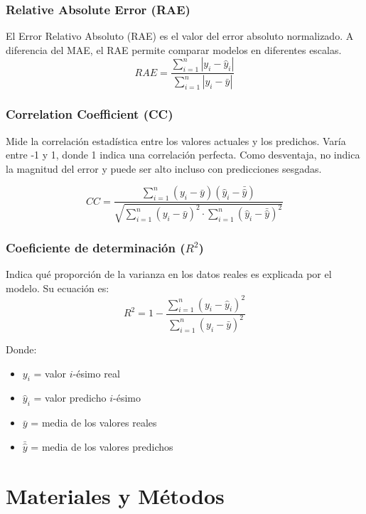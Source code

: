 \documentclass[12pt]{article}
\begin{document}
\subsubsection{Relative Absolute Error (RAE)}
El Error Relativo Absoluto (RAE) es el valor del error absoluto normalizado. A diferencia del MAE, el RAE permite comparar modelos en diferentes escalas.
\begin{equation}
    RAE = \frac{\sum_{i=1}^{n} | y_i - \hat{y}_i |}{\sum_{i=1}^{n} | y_i - \bar{y} |}
\end{equation}
\cite{De0a100enIA}

\subsubsection{Correlation Coefficient (CC)}
Mide la correlación estadística entre los valores actuales y los predichos. Varía entre -1 y 1, donde 1 indica una correlación perfecta. Como desventaja, no indica la magnitud del error y puede ser alto incluso con predicciones sesgadas. 

\begin{equation}
    CC = \frac{\sum_{i=1}^{n} (y_i - \bar{y})(\hat{y}_i - \bar{\hat{y}})}{\sqrt{\sum_{i=1}^{n} (y_i - \bar{y})^2 \cdot \sum_{i=1}^{n} (\hat{y}_i - \bar{\hat{y}})^2}}
\end{equation}

\subsubsection{Coeficiente de determinación (\texorpdfstring{$R^2$}{R2})}
Indica qué proporción de la varianza en los datos reales es explicada por el modelo. Su ecuación es:
\begin{equation}
    R^2 = 1 - \frac{\sum_{i=1}^{n} (y_i - \hat{y}_i)^2}{\sum_{i=1}^{n} (y_i - \bar{y})^2}
\end{equation}

Donde: 
\begin{itemize}
    \item $y_i$ = valor $i$-ésimo real
    \item $\hat{y}_i$ = valor predicho $i$-ésimo
    \item $\bar{y}$ = media de los valores reales
    \item $\bar{\hat{y}}$ = media de los valores predichos
\end{itemize}

\cite{De0a100enIA}

\section{Materiales y Métodos}
\end{document}

